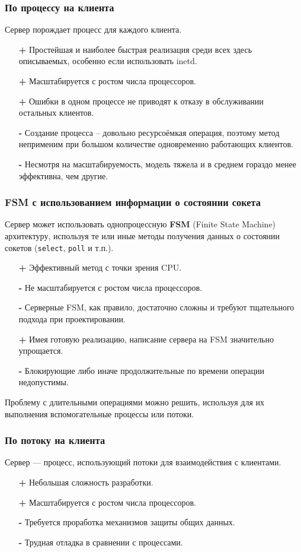 \subsubsection{По процессу на клиента}
Сервер порождает процесс для каждого клиента.
\begin{itemize}
  \item[\textbf{+}] Простейшая и наиболее быстрая реализация среди всех здесь описываемых, особенно если использовать inetd.
  \item[\textbf{+}] Масштабируется с ростом числа процессоров.
  \item[\textbf{+}] Ошибки в одном процессе не приводят к отказу в обслуживании остальных клиентов.
  \item[\textbf{-}] Создание процесса -- довольно ресурсоёмкая операция, поэтому метод неприменим при большом количестве одновременно работающих клиентов.
  \item[\textbf{-}] Несмотря на масштабируемость, модель тяжела и в среднем гораздо менее эффективна, чем другие.
\end{itemize}

\subsubsection{FSM с использованием информации о состоянии сокета}
Сервер может использовать однопроцессную \textbf{FSM} (Finite State Machine) архитектуру, используя те или иные методы получения данных о состоянии сокетов (\lstinline{select}, \lstinline{poll} и т.п.).
\begin{itemize}
  \item[\textbf{+}] Эффективный метод с точки зрения CPU.
  \item[\textbf{-}] Не масштабируется с ростом числа процессоров.
  \item[\textbf{-}] Серверные FSM, как правило, достаточно сложны и требуют тщательного подхода при проектировании.
  \item[\textbf{+}] Имея готовую реализацию, написание сервера на FSM значительно упрощается.
  \item[\textbf{-}] Блокирующие либо иначе продолжительные по времени операции недопустимы.
\end{itemize}

Проблему с длительными операциями можно решить, используя для их выполнения вспомогательные процессы или потоки.

\subsubsection{По потоку на клиента}
Сервер --- процесс, использующий потоки для взаимодействия с клиентами.
\begin{itemize}
  \item[\textbf{+}] Небольшая сложность разработки.
  \item[\textbf{+}] Масштабируется с ростом числа процессоров.
  \item[\textbf{-}] Требуется проработка механизмов защиты общих данных.
  \item[\textbf{-}] Трудная отладка в сравнении с процессами.
\end{itemize}

